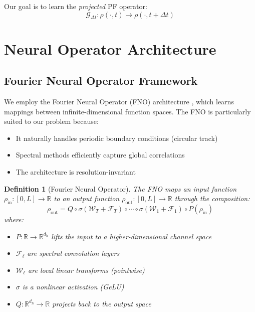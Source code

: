 \documentclass[11pt]{article}
\newcommand{\R}{\mathbb{R}}
\newtheorem{definition}{Definition}
\begin{document}
Our goal is to learn the \textit{projected} PF operator:
\begin{equation}
    \mathcal{G}_{\Delta t}: \rho(\cdot, t) \mapsto \rho(\cdot, t + \Delta t)
\end{equation}

\section{Neural Operator Architecture}

\subsection{Fourier Neural Operator Framework}

We employ the Fourier Neural Operator (FNO) architecture \cite{li2020fourier}, which learns mappings between infinite-dimensional function spaces. The FNO is particularly suited to our problem because:
\begin{itemize}
    \item It naturally handles periodic boundary conditions (circular track)
    \item Spectral methods efficiently capture global correlations
    \item The architecture is resolution-invariant
\end{itemize}

\begin{definition}[Fourier Neural Operator]
The FNO maps an input function $\rho_{\text{in}}: [0, L] \to \R$ to an output function $\rho_{\text{out}}: [0, L] \to \R$ through the composition:
\begin{equation}
    \rho_{\text{out}} = Q \circ \sigma(\mathcal{W}_T + \mathcal{F}_T) \circ \cdots \circ \sigma(\mathcal{W}_1 + \mathcal{F}_1) \circ P(\rho_{\text{in}})
\end{equation}
where:
\begin{itemize}
    \item $P: \R \to \R^{d_h}$ lifts the input to a higher-dimensional channel space
    \item $\mathcal{F}_\ell$ are spectral convolution layers
    \item $\mathcal{W}_\ell$ are local linear transforms (pointwise)
    \item $\sigma$ is a nonlinear activation (GeLU)
    \item $Q: \R^{d_h} \to \R$ projects back to the output space
\end{itemize}
\end{definition}
\end{document}
